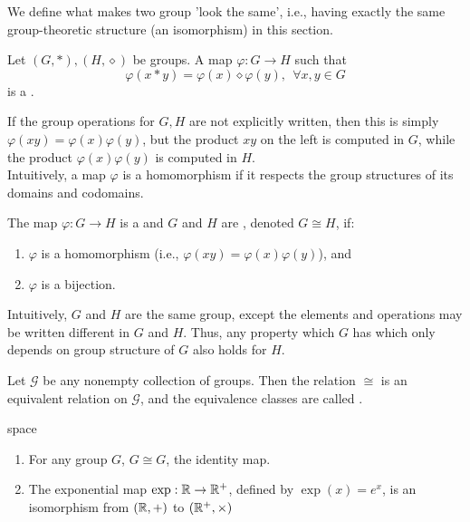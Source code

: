 We define what makes two group 'look the same', i.e., having exactly the same group-theoretic structure (an isomorphism) in this section.

\begin{definition}
Let $(G, *), (H, \diamond)$ be groups. A map $\varphi: G \rightarrow H$ such that
\begin{equation}
\varphi(x*y) = \varphi(x) \diamond \varphi(y), \ \ \forall x,y \in G \nonumber
\end{equation}
is a .
\end{definition}

If the group operations for $G, H$ are not explicitly written, then this is simply $\varphi(xy) = \varphi(x) \varphi(y)$, but the product $xy$ on the left is computed in $G$, while the product $\varphi(x) \varphi(y)$ is computed in $H$.\\
Intuitively, a map $\varphi$ is a homomorphism if it respects the group structures of its domains and codomains.

\begin{definition}
The map $\varphi: G \rightarrow H$ is a  and $G$ and $H$ are , denoted $G \cong H$, if:
\begin{enumerate}[label=(\roman*)]
\setlength{\itemsep}{0pt}
\item $\varphi$ is a homomorphism (i.e., $\varphi(xy) = \varphi(x) \varphi(y)$), and
\item $\varphi$ is a bijection.
\end{enumerate}
\end{definition}

Intuitively, $G$ and $H$ are the same group, except the elements and operations may be written different in $G$ and $H$. Thus, any property which $G$ has which only depends on group structure of $G$ also holds for $H$.

\begin{definition}
Let $\mathscr{G}$ be any nonempty collection of groups. Then the relation $\cong$ is an equivalent relation on $\mathscr{G}$, and the equivalence classes are called .
\end{definition}

\begin{example}{\color{white}space}
\begin{enumerate}[label=(\roman*)]
\setlength{\itemsep}{0pt}
\item For any group $G$, $G \cong G$, the identity map.
\item The exponential map $\exp : \mathbb{R} \rightarrow \mathbb{R}^+$, defined by $\exp(x)=e^x$, is an isomorphism from $(\mathbb{R}, +)$ to $(\mathbb{R}^+, \times)$
\end{enumerate}
\end{example}

